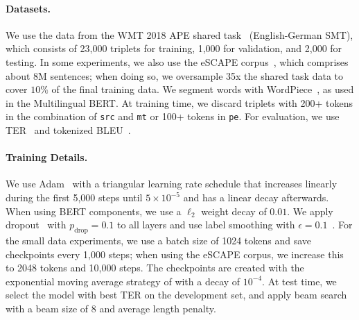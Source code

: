 \paragraph*{Datasets.}
We use the data from the WMT 2018 APE shared
task~\citep{Chatterjee2018} (English-German SMT), which consists of
23,000 triplets for training, 1,000 for validation, and 2,000 for
testing. In some experiments, we also use the eSCAPE
corpus~\citep{negri2018escape}, which comprises about 8M sentences;
when doing so, we oversample 35x the shared task data to cover $10\%$
of the final training data. We segment words with
WordPiece~\citep{wu2016google}, as used in the
Multilingual BERT. At training time, we discard triplets with 200+
tokens in the combination of {\tt src} and {\tt mt} or 100+ tokens in
    {\tt pe}. For evaluation, we use TER~\citep{snover2006study} and
tokenized BLEU~\citep{papineni2002bleu}.

\paragraph*{Training Details.}
We use Adam~\citep{kingma2014adam} with a triangular learning rate
schedule that increases linearly during the first 5,000 steps until
$5\times 10^{-5}$ and has a linear decay afterwards. When using BERT
components, we use a $\ell_2$ weight decay of $0.01$. We apply
dropout~\citep{srivastava2014dropout} with $p_{\text{drop}}=0.1$ to all
layers and use label smoothing with
$\epsilon=0.1$~\citep{pereyra2017regularizing}. For the small data
experiments, we use a batch size of 1024 tokens and save checkpoints
every 1,000 steps; when using the eSCAPE corpus, we increase this to
2048 tokens and 10,000 steps. The checkpoints are created with the
exponential moving average strategy of \citet{junczys2018marian}
with a decay of $10^{-4}$. At test time, we select the model with
best TER on the development set, and apply beam search with a beam
size of 8 and average length penalty.

